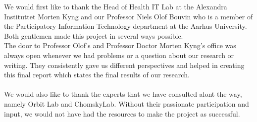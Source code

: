 \thispagestyle{empty}
{}

\vspace*{3cm}

\begin{center}
	\bigskip
	\bigskip
	\bigskip
    We would first like to thank the Head of Health IT Lab at the Alexandra Instituttet Morten Kyng and our Professor Niels Olof Bouvin who is a member of the Participatory Information Technology department at the Aarhus University. Both gentlemen made this project in several ways possible.\\
    \bigskip
    \bigskip
    \bigskip
    The door to Professor Olof's and Professor Doctor Morten Kyng's office was always open whenever we had problems or a question about our research or writing. They consistently gave us different perspectives and helped in creating this final report which states the final results of our research.\\\\
    \bigskip
    \bigskip
    \bigskip
    We would also like to thank the experts that we have consulted alont the way, namely Orbit Lab and ChomskyLab. Without their passionate participation and input, we would not have had the resources to make the project as successful.\\
\end{center}

\medskip
